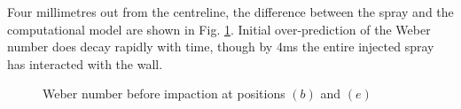 \documentclass[a4paper,10pt]{article}
\begin{document}
Four millimetres out from the centreline, the difference between the spray and the computational model are shown in Fig. \ref{fig:we_pre_be}. Initial over-prediction of the Weber number does decay rapidly with time, though by 4ms the entire injected spray has interacted with the wall.
\begin{figure}[H]
\centering
{}
\caption{Weber number before impaction at positions $(b)$ and $(e)$}
\label{fig:we_pre_be}
\end{figure}
\end{document}
